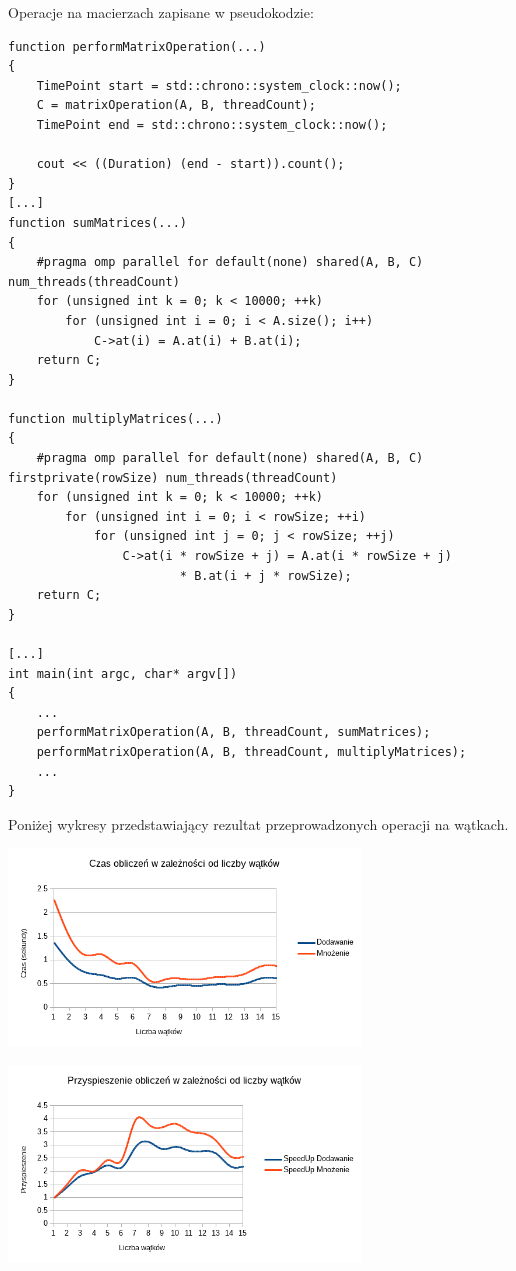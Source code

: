 \documentclass[a4paper,12pt]{article}
\begin{document}
Operacje na macierzach zapisane w pseudokodzie:
\begin{lstlisting}
function performMatrixOperation(...)
{
	TimePoint start = std::chrono::system_clock::now();
	C = matrixOperation(A, B, threadCount);
	TimePoint end = std::chrono::system_clock::now();

	cout << ((Duration) (end - start)).count();
}
[...]
function sumMatrices(...)
{
	#pragma omp parallel for default(none) shared(A, B, C) num_threads(threadCount)
	for (unsigned int k = 0; k < 10000; ++k)
		for (unsigned int i = 0; i < A.size(); i++)
			C->at(i) = A.at(i) + B.at(i);
	return C;
}

function multiplyMatrices(...)
{
	#pragma omp parallel for default(none) shared(A, B, C) firstprivate(rowSize) num_threads(threadCount)
	for (unsigned int k = 0; k < 10000; ++k)
		for (unsigned int i = 0; i < rowSize; ++i)
			for (unsigned int j = 0; j < rowSize; ++j)
				C->at(i * rowSize + j) = A.at(i * rowSize + j)
						* B.at(i + j * rowSize);
	return C;
}

[...]
int main(int argc, char* argv[])
{
	...
	performMatrixOperation(A, B, threadCount, sumMatrices);
	performMatrixOperation(A, B, threadCount, multiplyMatrices);
	...
}
\end{lstlisting}

Poniżej wykresy przedstawiający rezultat przeprowadzonych operacji na wątkach.
\\
\begin{center}
\includegraphics[width=0.7\textwidth]{data/czas.png}
\end{center}

\begin{center}
\includegraphics[width=0.7\textwidth]{data/przysp.png}
\end{center}
\end{document}
